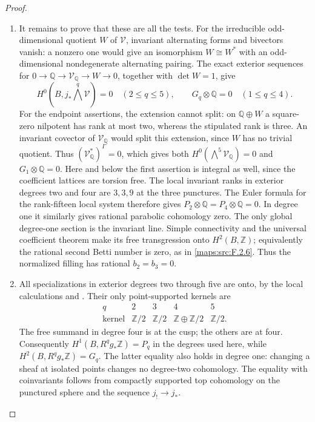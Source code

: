 \begin{proof}
\begin{enumerate}[label=\arabic*.]
\item It remains to prove that these are all the tests.
For the irreducible odd-dimensional quotient $W$
of $\mathcal V$, invariant alternating forms and
bivectors vanish: a nonzero one would give an
isomorphism $W\cong W^*$ with an odd-dimensional
nondegenerate alternating pairing.
The exact exterior sequences for
$0\to\mathbb Q\to\mathcal V_{\mathbb Q}\to W\to0$,
together with $\det W=1$, give
\[
 H^0(B,j_*\bigwedge^q\mathcal V)=0
       \quad(2\le q\le5),\qquad
 G_q\otimes\mathbb Q=0\quad(1\le q\le4).
 \tag{F.HC8}\label{maps:eq:F.HC8}
\]
For the endpoint assertions, the extension cannot split:
on $\mathbb Q\oplus W$ a square-zero nilpotent has rank at
most two, whereas the stipulated rank is three.
An invariant covector of $\mathcal V_{\mathbb Q}$ would
split this extension, since $W$ has no trivial quotient.
Thus $(\mathcal V_{\mathbb Q}^*)^\Gamma=0$, which gives
both $H^0(\bigwedge^5\mathcal V_{\mathbb Q})=0$ and
$G_1\otimes\mathbb Q=0$.
Here and below the first assertion is integral as well,
since the coefficient lattices are torsion free.
The local invariant ranks in exterior degrees two
and four are $3,3,9$ at the three punctures.
The Euler formula for the rank-fifteen local system
therefore gives $P_2\otimes\mathbb Q=P_4\otimes\mathbb Q=0$.
In degree one it similarly gives rational parabolic
cohomology zero.
The only global degree-one section is the invariant
line.  Simple connectivity and the universal
coefficient theorem make its free transgression
onto $H^2(B,\mathbb Z)$; equivalently the rational
second Betti number is zero, as in \ref{maps:src:F.2.6}.
Thus the normalized filling has rational $b_2=b_3=0$.

\item All specializations in exterior degrees two through
five are onto, by the local calculations and .
Their only point-supported kernels are
\[
\begin{array}{c|cccc}
q&2&3&4&5\\ \hline
\text{kernel}&\mathbb Z/2&\mathbb Z/2&
                 \mathbb Z\oplus\mathbb Z/2&\mathbb Z/2 .
\end{array}
\tag{F.HC9}\label{maps:eq:F.HC9}
\]
The free summand in degree four is at the cusp; the
others are at four.
Consequently $H^1(B,R^qg_*\mathbb Z)=P_q$ in the
degrees used here, while
$H^2(B,R^qg_*\mathbb Z)=G_q$.
The latter equality also holds in degree one:
changing a sheaf at isolated points changes no
degree-two cohomology.  The equality with coinvariants
follows from compactly supported top cohomology on
the punctured sphere and the sequence $j_!\to j_*$.


\end{enumerate}
\end{proof}
